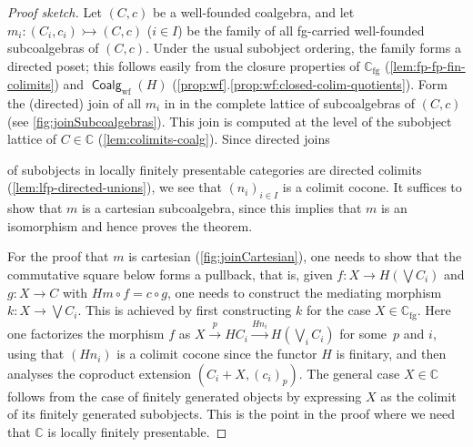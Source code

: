 \documentclass[10pt,a4paper]{article}
\theoremstyle{definition}
\theoremstyle{remark}
\numberwithin{equation}{section}
\providecommand{\xto}[1]{\,\xrightarrow{#1}\,}
\newcommand{\lfplong}{locally finitely presentable\xspace}
\newcommand{\lfp}{\lfplong}
\providecommand{\C}{}
\newcommand{\fg}{{\mathrm{fg}}}
\newcommand{\wf}{{\mathrm{wf}}}
\renewcommand{\C}{{\mathbb{C}}}
\newcommand{\iref}[2]{\autoref{#1}.\ref{#1:#2}}
\DeclareMathOperator{\Coalg}{\mathsf{Coalg}}
\newcommand{\xra}{\xrightarrow}
\renewcommand{\xto}{\xra}
\newcommand{\monoto}{\rightarrowtail}
\theoremstyle{plain}
\theoremstyle{definition}
\begin{document}
\begin{proof}[Proof sketch]
Let $(C,c)$ be a well-founded coalgebra, and let $m_i\colon (C_i,c_i)\monoto (C,c)$ ($i\in I$) be the family of all fg-carried well-founded subcoalgebras of $(C,c)$. Under the usual subobject ordering, the family forms a directed poset; this follows easily from the closure properties of $\C_\fg$ (\autoref{lem:fp-fp-fin-colimits}) and $\Coalg_{\wf}(H)$ (\iref{prop:wf}{closed-colim-quotients}). Form the (directed) join of all $m_i$ in
in the complete lattice of subcoalgebras of $(C,c)$ (see \autoref{fig:joinSubcoalgebras}). This join is computed at the level of the subobject lattice of $C\in \C$ (\autoref{lem:colimits-coalg}). Since directed joins 


\noindent of subobjects in \lfp categories are directed colimits (\autoref{lem:lfp-directed-unions}), we see that $(n_i)_{i\in I}$ is a colimit cocone. It suffices to show that $m$ is a cartesian subcoalgebra, since this implies that $m$ is an isomorphism and hence proves the theorem. 

For the proof that $m$ is cartesian (\autoref{fig:joinCartesian}), one needs to show that the commutative square below forms a pullback, that is, given $f\colon X\to H(\bigvee C_i)$ and $g\colon X\to C$ with
$Hm\circ f = c\circ g$, one
needs to construct the mediating morphism $k\colon X\to \bigvee C_i$. This is achieved by first constructing $k$ for the case $X\in \C_\fg$. Here one factorizes the morphism $f$ as $X\xto{p} HC_i \xto{Hn_i} H(\bigvee_i C_i)$ for some~$p$ and $i$, using that $(Hn_i)$ is a colimit cocone since the functor $H$ is finitary, and then analyses the coproduct extension $(C_i+X,(c_i)_p)$. The general case $X\in \C$ follows from the case 
of finitely generated objects by expressing $X$ as the colimit of its finitely generated subobjects. This is the point in the proof where we need that $\C$ is \lfp. 
\end{proof}
\end{document}
